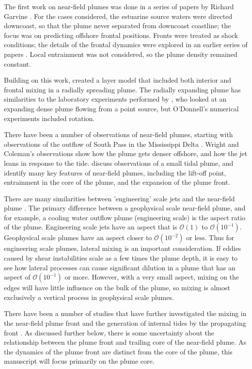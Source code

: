 \documentclass[12pt]{article}
\begin{document}
The first work on near-field plumes was done in a series of papers by Richard Garvine \citep[notably,][]{garvine:82, odonnell.garvine:83, garvine:87}. For the cases considered, the estuarine source waters were directed downcoast, so that the plume never separated from downcoast coastline; the focus was on predicting offshore frontal positions. Fronts were treated as shock conditions; the details of the frontal dynamics were explored in an earlier series of papers \citep{garvine:74, garvine.monk:74}. Local entrainment was not considered, so the plume density remained constant. 

Building on this work, \citet{odonnell:90} created a layer model that included both interior and frontal mixing in a radially spreading plume. The radially expanding plume has similarities to the laboratory experiments performed by \citet{britter.simpson:78}, who looked at an expanding dense plume flowing from a point source, but O'Donnell's numerical experiments included rotation.

There have been a number of observations of near-field plumes, starting with observations of the outflow of South Pass in the Mississippi Delta \citep{wright.coleman:71}. Wright and Coleman's observations show how the plume gets denser offshore, and how the jet leans in response to the tide. \citet{luketina.imberger:87} discuss observations of a small tidal plume, and identify many key features of near-field plumes, including the lift-off point, entrainment in the core of the plume, and the expansion of the plume front. 

There are many similarities between 'engineering' scale jets and the near-field plume \citep[see][]{jones.ea:07}. The primary difference between a geophysical scale near-field plume, and for example, a cooling water outflow plume (engineering scale) is the aspect ratio of the plume. Engineering scale jets have an aspect that is $\mathcal{O}(1)$ to $\mathcal{O}(10^{-1})$. Geophysical scale plumes have an aspect closer to $\mathcal{O}(10^{-2})$ or less. Thus for engineering scale plumes, lateral mixing is an important consideration. If eddies caused by shear instabilities scale as a few times the plume depth, it is easy to see how lateral processes can cause significant dilution in a plume that has an aspect of $\mathcal{O}(10^{-1})$ or more. However, with a very small aspect, mixing on the edges will have little influence on the bulk of the plume, so mixing is almost exclusively a vertical process in geophysical scale plumes.

There have been a number of studies that have further investigated the mixing in the near-field plume front \citep[e.g.,][]{odonnell.ea:98, orton.jay:05, kilcher.nash:10} and the generation of internal tides by the propagating front \citep{nash.moum:05, stashchuk.vlasenko:09}. As discussed further below, there is some uncertainty about the relationship between the plume front and trailing core of the near-field plume. As the dynamics of the plume front are distinct from the core of the plume, this manuscript will focus primarily on the plume core.
\end{document}
